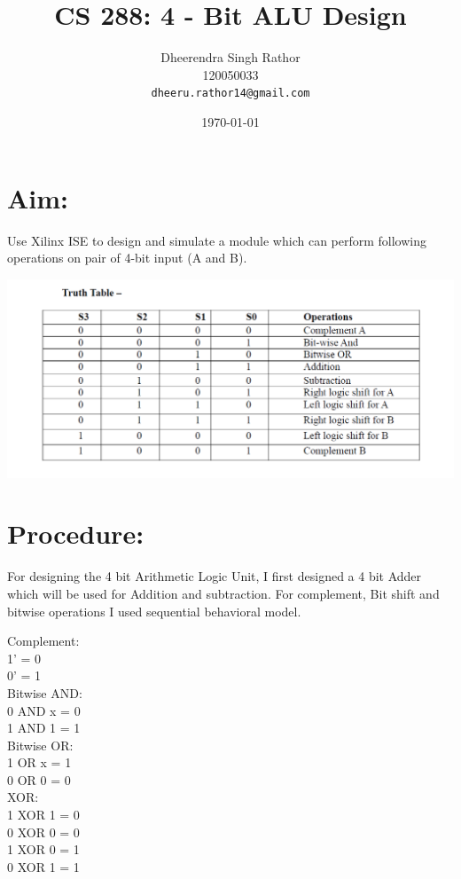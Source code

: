 \documentclass[12pt]{article}
\begin{document}
\title{\vspace{15ex}\Huge{CS 288: 4 - Bit ALU Design}\vspace{15ex}}


\author{
  Dheerendra Singh Rathor\\120050033\\
  \texttt{dheeru.rathor14@gmail.com}\\[1 cm]
}

\date{\today}
\maketitle
\newpage

\section{Aim:}
Use Xilinx ISE to design and simulate a module which can perform following operations on pair of 4-bit input (A and B).
\begin{center}
\includegraphics[scale=0.7]{Capture1}
\end{center}

\section{Procedure:}
For designing the 4 bit Arithmetic Logic Unit, I first designed a 4 bit Adder which will be used for 
Addition and subtraction. For complement, Bit shift and bitwise operations I used sequential behavioral model. \\
\begin{center}

Complement:\\
1' = 0\\
0' = 1\\ 
\vspace{3 mm}
Bitwise AND:\\
0 AND x = 0\\
1 AND 1 = 1\\ 
\vspace{3 mm}
Bitwise OR:\\
1 OR x = 1\\
0 OR 0 = 0\\
\vspace{3 mm}
XOR:\\
1 XOR 1 = 0\\
0 XOR 0 = 0\\
1 XOR 0 = 1\\
0 XOR 1 = 1\\

\end{center}
\end{document}
